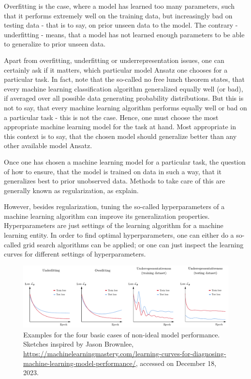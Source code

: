 \documentclass[a4paper,12pt]{report}
\begin{document}
Overfitting is the case, where a model has learned too many parameters, such that it performs extremely well on the training data, but increasingly bad on testing data - that is to say, on prior unseen data to the model. The contrary - underfitting - means, that a model has not learned enough parameters to be able to generalize to prior unseen data.

Apart from overfitting, underfitting or underrepresentation issues, one can certainly ask if it matters, which particular model Ansatz one chooses for a particular task. In fact, \cite[p.116]{Goodfellow.2016} note that the so-called no free lunch theorem states, that every machine learning classification algorithm generalized equally well (or bad), if averaged over all possible data generating probability distributions. But this is not to say, that every machine learning algorithm performs equally well or bad on a particular task - this is not the case. Hence, one must choose the most appropriate machine learning model for the task at hand. Most appropriate in this context is to say, that the chosen model should generalize better than any other available model Ansatz.

Once one has chosen a machine learning model for a particular task, the question of how to ensure, that the model is trained on data in such a way, that it generalizes best to prior unobserved data. Methods to take care of this are generally known as regularization, as \cite[p.120]{Goodfellow.2016} explain.

However, besides regularization, tuning the so-called hyperparameters of a machine learning algorithm can improve its generalization properties. Hyperparameters are just settings of the learning algorithm for a machine learning entity. In order to find optimal hyperparameters, one can either do a so-called grid search algorithms can be applied; or one can just inspect the learning curves for different settings of hyperparameters.
\begin{figure}[h]
\centering
\includegraphics[width=\textwidth]{figures/learningcurves.pdf}
\caption{Examples for the four basic cases of non-ideal model performance. Sketches inspired by Jason Brownlee, \url{https://machinelearningmastery.com/learning-curves-for-diagnosing-machine-learning-model-performance/}, accessed on December 18, 2023.}
\label{fig:learningcurves}
\end{figure}
\end{document}
